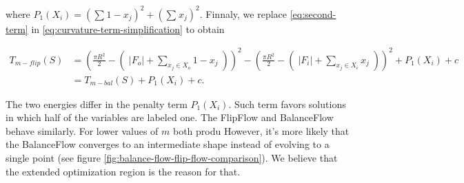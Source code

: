 where $P_1(X_i) = (\sum_{}{ 1-x_j})^2 + (\sum_{}{x_j})^2$. Finnaly, we  replace \eqref{eq:second-term} in \eqref{eq:curvature-term-simplification} to obtain

\begin{align}
T_{m-flip}(S) &= ( \frac{\pi R^2}{2} - (\; |F_o| + \sum_{ x_j \in X_o}{1-x_j} \; ) )^2 -(\frac{\pi R^2}{2} - (\; |F_i| + \sum_{x_j \in X_i}{x_j}\;))^2  + P_1(X_i) + c \nonumber \\
&= T_{m-bal}(S) + P_1(X_i) + c.
\end{align}

The two energies differ in the penalty term $P_1(X_i)$. Such term favors solutions in which half of the variables are labeled one. The FlipFlow and BalanceFlow behave similarly. For lower values of $m$ both produ However, it's more likely that the BalanceFlow converges to an intermediate shape instead of evolving to a single point (see figure \ref{fig:balance-flow-flip-flow-comparison}). We believe that the extended optimization region is the reason for that.

